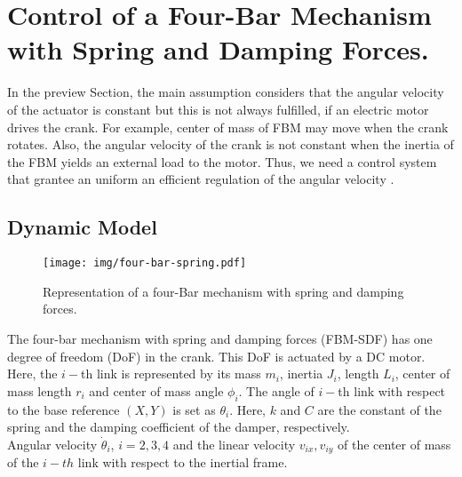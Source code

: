 \documentclass[12pt,letterpape]{article}
\begin{document}
		

\section{Control of a Four-Bar Mechanism with Spring and Damping Forces.} %
\label{sec:control}

In the preview Section, the main assumption considers that the angular velocity
of the actuator is constant but this is not always fulfilled, if an electric motor
drives the crank. For example, center of mass of FBM may move when the crank rotates.
Also, the angular velocity of the crank is not constant when the inertia of the 
FBM yields an external load to the motor. Thus, we need a control system that grantee 
an uniform an efficient regulation of the angular velocity \cite{calva13}.

\subsection{Dynamic Model} %
\label{sub:dynamic_model}

\begin{figure}[!ht]
	\centering
	\texttt{[image: img/four-bar-spring.pdf]}
	\caption{Representation of a four-Bar mechanism with spring and damping forces.}
\end{figure}

The four-bar mechanism with spring and damping forces (FBM-SDF) has one degree of
freedom (DoF) in the crank. This DoF is actuated by a DC motor. Here, the $i-$th
link is represented by its mass $m_i$, inertia $J_i$, length $L_i$, center of mass
length $r_i$ and center of mass angle $\phi_i$. The angle of $i-$th link with
respect to the base reference $(X, Y)$ is set as $\theta_i$. Here, $k$ and $C$
are the constant of the spring and the damping coefficient of the damper, respectively.\\

Angular velocity $\dot{\theta}_i$, $ i = 2,3,4$ and the linear velocity $v_{ix},v_{iy}$
of the center of mass of the $i-th$ link with respect to the inertial frame.
\end{document}
